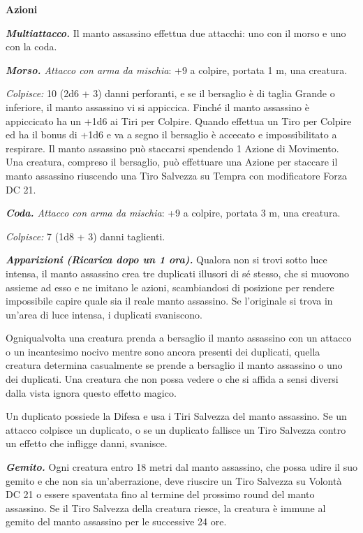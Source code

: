 \begin{multicols}{2}
{\textbf{Azioni}

\emph{\textbf{Multiattacco.}} Il manto assassino effettua due attacchi: uno con il morso e uno con la coda.

\emph{\textbf{Morso.} Attacco con arma da mischia}: +9 a colpire, portata 1 m, una creatura.

\emph{Colpisce:} 10 (2d6 + 3) danni perforanti, e se il bersaglio è di taglia Grande o inferiore, il manto assassino vi si appiccica.
Finché il manto assassino è appiccicato ha un +1d6 ai Tiri per Colpire. Quando effettua un Tiro per Colpire ed ha il bonus di +1d6 e va a segno il bersaglio è accecato e impossibilitato a respirare. Il manto assassino può staccarsi spendendo 1 Azione di Movimento. Una creatura, compreso il bersaglio, può effettuare una Azione per staccare il manto assassino riuscendo una Tiro Salvezza su Tempra con modificatore Forza DC 21.

\emph{\textbf{Coda.} Attacco con arma da mischia}: +9 a colpire, portata 3 m, una creatura.

\emph{Colpisce:} 7 (1d8 + 3) danni taglienti.

\emph{\textbf{Apparizioni (Ricarica dopo un 1 ora).}} Qualora non si trovi sotto luce intensa, il manto assassino crea tre duplicati illusori di sé stesso, che si muovono assieme ad esso e ne imitano le azioni, scambiandosi di posizione per rendere impossibile capire quale sia il reale manto assassino. Se l'originale si trova in un'area di luce intensa, i duplicati svaniscono.

Ogniqualvolta una creatura prenda a bersaglio il manto assassino con un attacco o un incantesimo nocivo mentre sono ancora presenti dei duplicati, quella creatura determina casualmente se prende a bersaglio il manto assassino o uno dei duplicati. Una creatura che non possa vedere o che si affida a sensi diversi dalla vista ignora questo effetto magico.

Un duplicato possiede la Difesa e usa i Tiri Salvezza del manto assassino. Se un attacco colpisce un duplicato, o se un duplicato fallisce un Tiro Salvezza contro un effetto che infligge danni, svanisce.

\emph{\textbf{Gemito.}} Ogni creatura entro 18 metri dal manto assassino, che possa udire il suo gemito e che non sia un'aberrazione, deve riuscire un Tiro Salvezza su Volontà DC 21 o essere spaventata fino al termine del prossimo round del manto assassino. Se il Tiro Salvezza della creatura riesce, la creatura è immune al gemito del manto assassino per le successive 24 ore.

}
\end{multicols}
